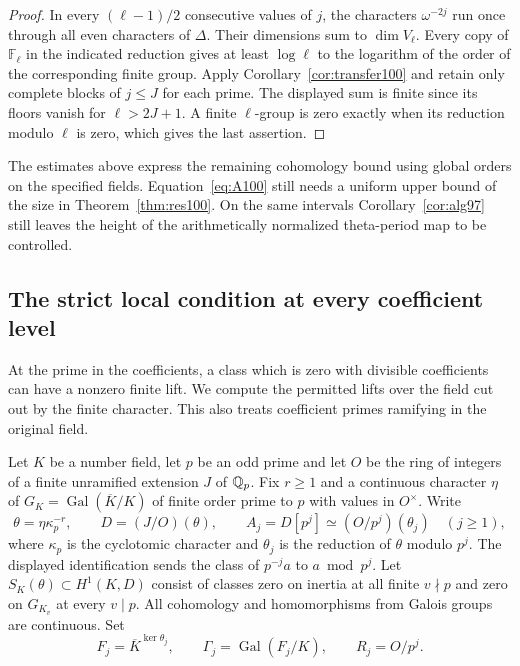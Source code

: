 \documentclass[a4paper,11pt]{article}
\theoremstyle{definition}
\theoremstyle{remark}
\numberwithin{equation}{section}
\begin{document}
\begin{proof}
In every \((\ell-1)/2\) consecutive values of \(j\), the
characters \(\omega^{-2j}\) run once through all even characters
of \(\Delta\). Their dimensions sum to \(\dim V_\ell\).
Every copy of \(\mathbb F_\ell\) in the indicated reduction gives
at least \(\log\ell\) to the logarithm of the order of the
corresponding finite group. Apply Corollary~\ref{cor:transfer100}
and retain only complete blocks of \(j\le J\) for each prime.
The displayed sum is finite since its floors vanish for
\(\ell>2J+1\). A finite \(\ell\)-group is zero exactly when its
reduction modulo \(\ell\) is zero, which gives the last assertion.
\end{proof}

The estimates above express the remaining cohomology bound using
global orders on the specified fields. Equation~\eqref{eq:A100}
still needs a uniform upper bound of the size in
Theorem~\ref{thm:res100}. On the same intervals
Corollary~\ref{cor:alg97} still leaves the height of the
arithmetically normalized theta-period map to be controlled.

\subsection{The strict local condition at every coefficient level}\label{nav:III-16}
\label{sec:every113}

At the prime in the coefficients, a class which is zero with
divisible coefficients can have a nonzero finite lift. We compute
the permitted lifts over the field cut out by the finite character.
This also treats coefficient primes ramifying in the original field.

Let \(K\) be a number field, let \(p\) be an odd prime and let
\(O\) be the ring of integers of a finite unramified extension \(J\)
of \(\mathbb Q_p\). Fix \(r\ge1\) and a continuous character \(\eta\) of
\(G_K=\operatorname{Gal}(\overline K/K)\) of finite order prime to
\(p\) with values in \(O^\times\). Write
\[
 \theta=\eta\kappa_p^{-r},\qquad D=(J/O)(\theta),\qquad
 A_j=D[p^j]\simeq (O/p^j)(\theta_j)\quad(j\ge1),
\]
where \(\kappa_p\) is the cyclotomic character and \(\theta_j\)
is the reduction of \(\theta\) modulo \(p^j\). The displayed
identification sends the class of \(p^{-j}a\) to \(a\bmod p^j\).
Let \(S_K(\theta)\subset H^1(K,D)\) consist of classes zero on
inertia at all finite \(v\nmid p\) and zero on \(G_{K_v}\) at
every \(v\mid p\). All cohomology and homomorphisms from Galois
groups are continuous. Set
\[
 F_j=\overline K^{\ker\theta_j},\qquad
 \Gamma_j=\operatorname{Gal}(F_j/K),\qquad R_j=O/p^j.
\]
\end{document}
